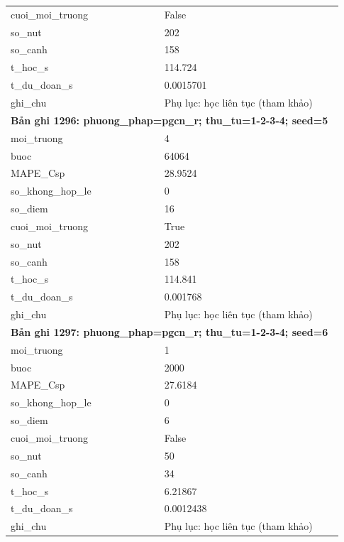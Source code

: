 \begin{longtable}{p{0.43\linewidth}p{0.50\linewidth}}
cuoi\_\allowbreak moi\_\allowbreak truong & False \\
so\_\allowbreak nut & 202 \\
so\_\allowbreak canh & 158 \\
t\_\allowbreak hoc\_\allowbreak s & 114.724 \\
t\_\allowbreak du\_\allowbreak doan\_\allowbreak s & 0.0015701 \\
ghi\_\allowbreak chu & Phụ lục: học liên tục (tham khảo) \\
\midrule
\multicolumn{2}{p{0.95\linewidth}}{\textbf{Bản ghi 1296: phuong\_phap=pgcn\_r; thu\_tu=1-2-3-4; seed=5}} \\
moi\_\allowbreak truong & 4 \\
buoc & 64064 \\
MAPE\_\allowbreak Csp & 28.9524 \\
so\_\allowbreak khong\_\allowbreak hop\_\allowbreak le & 0 \\
so\_\allowbreak diem & 16 \\
cuoi\_\allowbreak moi\_\allowbreak truong & True \\
so\_\allowbreak nut & 202 \\
so\_\allowbreak canh & 158 \\
t\_\allowbreak hoc\_\allowbreak s & 114.841 \\
t\_\allowbreak du\_\allowbreak doan\_\allowbreak s & 0.001768 \\
ghi\_\allowbreak chu & Phụ lục: học liên tục (tham khảo) \\
\midrule
\multicolumn{2}{p{0.95\linewidth}}{\textbf{Bản ghi 1297: phuong\_phap=pgcn\_r; thu\_tu=1-2-3-4; seed=6}} \\
moi\_\allowbreak truong & 1 \\
buoc & 2000 \\
MAPE\_\allowbreak Csp & 27.6184 \\
so\_\allowbreak khong\_\allowbreak hop\_\allowbreak le & 0 \\
so\_\allowbreak diem & 6 \\
cuoi\_\allowbreak moi\_\allowbreak truong & False \\
so\_\allowbreak nut & 50 \\
so\_\allowbreak canh & 34 \\
t\_\allowbreak hoc\_\allowbreak s & 6.21867 \\
t\_\allowbreak du\_\allowbreak doan\_\allowbreak s & 0.0012438 \\
ghi\_\allowbreak chu & Phụ lục: học liên tục (tham khảo) \\

\end{longtable}
